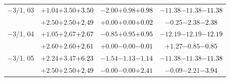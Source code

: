 \documentclass[compress]{beamer}
\begin{document}
\begin{frame}
\begin{tabular}{r | c | c | c}
$-$3/1, 03 & $+1.04$\hspace{0.1 cm}$+3.50$\hspace{0.1 cm}\textcolor{black}{$+3.50$} & $-2.00$\hspace{0.1 cm}$+0.98$\hspace{0.1 cm}\textcolor{black}{$+0.98$} & $-11.38$\hspace{0.1 cm}$-11.38$\hspace{0.1 cm}\textcolor{black}{$-11.38$} \\
           & $+2.50$\hspace{0.1 cm}$+2.50$\hspace{0.1 cm}\textcolor{black}{$+2.49$} & $+0.00$\hspace{0.1 cm}$+0.00$\hspace{0.1 cm}\textcolor{black}{$+0.02$} & $-0.25$\hspace{0.1 cm}$-2.38$\hspace{0.1 cm}\textcolor{black}{$-2.38$} \\
$-$3/1, 04 & $+1.05$\hspace{0.1 cm}$+2.67$\hspace{0.1 cm}\textcolor{black}{$+2.67$} & $-0.85$\hspace{0.1 cm}$+0.95$\hspace{0.1 cm}\textcolor{black}{$+0.95$} & $-12.19$\hspace{0.1 cm}$-12.19$\hspace{0.1 cm}\textcolor{black}{$-12.19$} \\
           & $+2.60$\hspace{0.1 cm}$+2.60$\hspace{0.1 cm}\textcolor{black}{$+2.61$} & $+0.00$\hspace{0.1 cm}$-0.00$\hspace{0.1 cm}\textcolor{black}{$-0.01$} & $+1.27$\hspace{0.1 cm}$-0.85$\hspace{0.1 cm}\textcolor{black}{$-0.85$} \\
$-$3/1, 05 & $+2.24$\hspace{0.1 cm}$+3.47$\hspace{0.1 cm}\textcolor{black}{$+6.23$} & $-1.54$\hspace{0.1 cm}$-1.13$\hspace{0.1 cm}\textcolor{black}{$-1.14$} & $-11.38$\hspace{0.1 cm}$-11.38$\hspace{0.1 cm}\textcolor{black}{$-11.38$} \\
           & $+2.50$\hspace{0.1 cm}$+2.50$\hspace{0.1 cm}\textcolor{black}{$+2.49$} & $-0.00$\hspace{0.1 cm}$-0.00$\hspace{0.1 cm}\textcolor{black}{$+2.41$} & $-0.09$\hspace{0.1 cm}$-2.21$\hspace{0.1 cm}\textcolor{black}{$-3.94$} \\

\end{tabular}
\end{frame}
\end{document}
